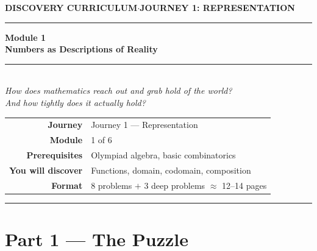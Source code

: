 \documentclass[12pt, a4paper]{article}
\newcounter{problem}
\begin{document}

\thispagestyle{empty}
\begin{center}
{\small\color{MidBlue}\textbf{DISCOVERY CURRICULUM}\quad$\cdot$\quad\textbf{JOURNEY 1: REPRESENTATION}}

\vspace{0.6cm}
{\color{NavyBlue}\rule{\linewidth}{2pt}}
\vspace{0.5cm}

{\Huge\bfseries\color{NavyBlue}Module 1}\\[0.3cm]
{\LARGE\bfseries\color{MidBlue}Numbers as Descriptions of Reality}\\[0.4cm]
{\color{Gold}\rule{0.4\linewidth}{1.2pt}}\\[0.4cm]
{\large\itshape\color{DarkGrey}How does mathematics reach out and grab hold of the world?\\[0.15cm]
And how tightly does it actually hold?}

\vspace{1cm}
\begin{tabular}{rl}
\color{DarkGrey}\textbf{Journey}           & Journey 1 --- Representation \\[4pt]
\color{DarkGrey}\textbf{Module}            & 1 of 6 \\[4pt]
\color{DarkGrey}\textbf{Prerequisites}     & Olympiad algebra, basic combinatorics \\[4pt]
\color{DarkGrey}\textbf{You will discover} & Functions, domain, codomain, composition \\[4pt]
\color{DarkGrey}\textbf{Format}            & 8 problems $+$ 3 deep problems $\approx$ 12--14 pages \\
\end{tabular}

\vspace{1cm}
{\color{NavyBlue}\rule{\linewidth}{2pt}}
\end{center}

\newpage


\section{Part 1 \texorpdfstring{---}{--} The Puzzle}
\end{document}
